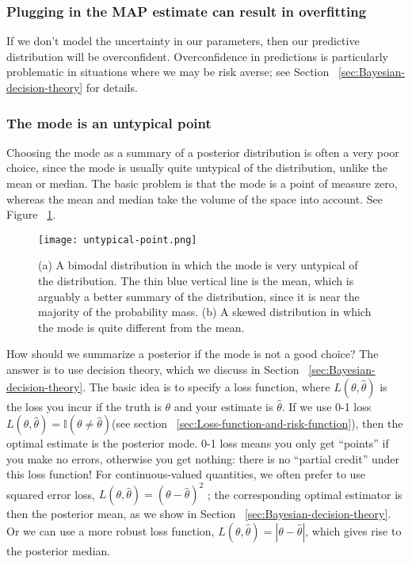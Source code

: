 \subsubsection{Plugging in the MAP estimate can result in overfitting}
If we don’t model the uncertainty in our parameters, then our predictive distribution will be overconfident. Overconfidence in predictions is particularly problematic in situations where we may be risk averse; see Section ~\ref{sec:Bayesian-decision-theory} for details.

\subsubsection{The mode is an untypical point}
Choosing the mode as a summary of a posterior distribution is often a very poor choice, since the mode is usually quite untypical of the distribution, unlike the mean or median. The basic problem is that the mode is a point of measure zero, whereas the mean and median take the volume of the space into account. See Figure ~\ref{fig:untypical-point}.

\begin{figure}[hbtp]
\centering
    \texttt{[image: untypical-point.png]}
\caption{(a) A bimodal distribution in which the mode is very untypical of the distribution. The thin blue vertical line is the mean, which is arguably a better summary of the distribution, since it is near the majority of the probability mass. (b) A skewed distribution in which the mode is quite different from the mean.}
\label{fig:untypical-point} 
\end{figure}

How should we summarize a posterior if the mode is not a good choice? The answer is to use decision theory, which we discuss in Section ~\ref{sec:Bayesian-decision-theory}. The basic idea is to specify a loss function, where $L(\theta,\hat{\theta})$ is the loss you incur if the truth is $\theta$ and your estimate is $\hat{\theta}$. If we use 0-1 loss $L(\theta,\hat{\theta})=\mathbb{I}(\theta \neq \hat{\theta})$(see section ~\ref{sec:Loss-function-and-risk-function}), then the optimal estimate is the posterior mode. 0-1 loss means you only get “points” if you make no errors, otherwise you get nothing: there is no “partial credit” under this loss function! For continuous-valued quantities, we often prefer to use squared error loss, $L(\theta,\hat{\theta})=(\theta-\hat{\theta})^2$ ; the corresponding optimal estimator is then the posterior mean, as we show in Section ~\ref{sec:Bayesian-decision-theory}. Or we can use a more robust loss function, $L(\theta,\hat{\theta})=|\theta-\hat{\theta}|$, which gives rise to the posterior median.

